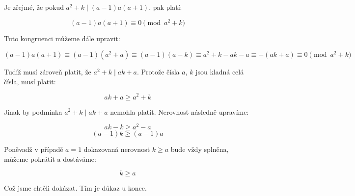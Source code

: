 \documentclass{fkssolpub}
\author{Ondřej Sedláček}
\begin{document}
 

Je zřejmé, že pokud $a^2 + k \mid (a - 1) a (a + 1)$, pak platí:

\[
  (a - 1) a (a + 1) \equiv 0 \pmod{a^2 + k}
\]

Tuto kongruenci můžeme dále upravit:

\[
  (a - 1) a (a + 1) \equiv (a - 1) (a^2 + a) \equiv (a - 1) (a - k) \equiv
  a^2 + k - ak - a \equiv -(ak + a) \equiv 0 \pmod {a^2 + k}
\]

Tudíž musí zároveň platit, že $a^2 + k \mid ak + a$. Protože čísla
$a$, $k$ jsou kladná celá čísla, musí platit:

\[
  ak + a \geq a^2 + k
\]

Jinak by podmínka $a^2 + k \mid ak + a$ nemohla platit. Nerovnost následně 
upravíme:

\[
  ak - k \geq a^2 - a
\]
\[
  (a - 1) k \geq (a - 1) a
\]

Poněvadž v případě $a = 1$ dokazovaná nerovnost $k \geq a$ bude vždy splněna,
můžeme pokrátit a dostáváme:

\[
  k \geq a
\]

Což jsme chtěli dokázat. Tím je důkaz u konce.
\end{document}
